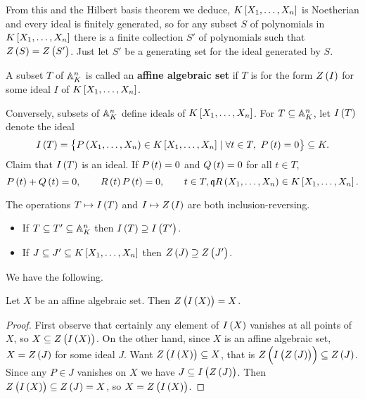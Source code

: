 From this and the Hilbert basis theorem we deduce, $ K\sbr{X_1, \dots, X_n} $ is Noetherian and every ideal is finitely generated, so for any subset $ S $ of polynomials in $ K\sbr{X_1, \dots, X_n} $ there is a finite collection $ S' $ of polynomials such that $ Z\br{S} = Z\br{S'} $. Just let $ S' $ be a generating set for the ideal generated by $ S $.

\begin{definition}
A subset $ T $ of $ \mathbb{A}_K^n $ is called an \textbf{affine algebraic set} if $ T $ is for the form $ Z\br{I} $ for some ideal $ I $ of $ K\sbr{X_1, \dots, X_n} $.
\end{definition}

Conversely, subsets of $ \mathbb{A}_K^n $ define ideals of $ K\sbr{X_1, \dots, X_n} $. For $ T \subseteq \mathbb{A}_K^n $, let $ I\br{T} $ denote the ideal
$$ I\br{T} = \cbr{P\br{X_1, \dots, X_n} \in K\sbr{X_1, \dots, X_n} \mid \forall t \in T, \ P\br{t} = 0} \subseteq K. $$
Claim that $ I\br{T} $ is an ideal. If $ P\br{t} = 0 $ and $ Q\br{t} = 0 $ for all $ t \in T $,
$$ P\br{t} + Q\br{t} = 0, \qquad R\br{t}P\br{t} = 0, \qquad t \in T, \qq R\br{X_1, \dots, X_n} \in K\sbr{X_1, \dots, X_n}. $$

\begin{note*}
The operations $ T \mapsto I\br{T} $ and $ I \mapsto Z\br{I} $ are both inclusion-reversing.
\begin{itemize}
\item If $ T \subseteq T' \subseteq \mathbb{A}_K^n $ then $ I\br{T} \supseteq I\br{T'} $.
\item If $ J \subseteq J' \subseteq K\sbr{X_1, \dots, X_n} $ then $ Z\br{J} \supseteq Z\br{J'} $.
\end{itemize}
\end{note*}

We have the following.

\begin{lemma}
Let $ X $ be an affine algebraic set. Then $ Z\br{I\br{X}} = X $.
\end{lemma}

\begin{proof}
First observe that certainly any element of $ I\br{X} $ vanishes at all points of $ X $, so $ X \subseteq Z\br{I\br{X}} $. On the other hand, since $ X $ is an affine algebraic set, $ X = Z\br{J} $ for some ideal $ J $. Want $ Z\br{I\br{X}} \subseteq X $, that is $ Z\br{I\br{Z\br{J}}} \subseteq Z\br{J} $. Since any $ P \in J $ vanishes on $ X $ we have $ J \subseteq I\br{Z\br{J}} $. Then $ Z\br{I\br{X}} \subseteq Z\br{J} = X $, so $ X = Z\br{I\br{X}} $.
\end{proof}

